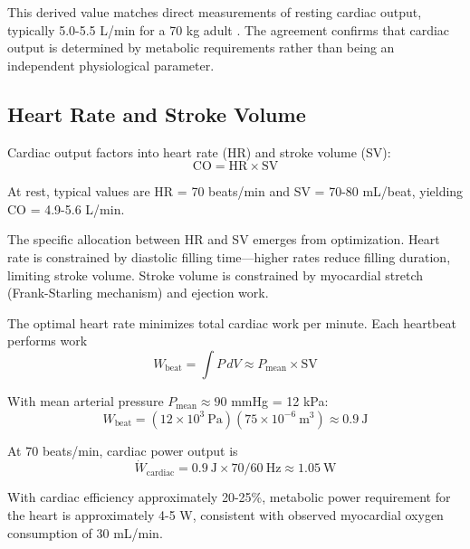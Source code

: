 \documentclass[10pt,twocolumn,a4paper]{article}
\theoremstyle{remark}
\begin{document}
This derived value matches direct measurements of resting cardiac output, typically 5.0-5.5 L/min for a 70 kg adult \cite{holt1968hemodynamic}. The agreement confirms that cardiac output is determined by metabolic requirements rather than being an independent physiological parameter.

\subsection{Heart Rate and Stroke Volume}

Cardiac output factors into heart rate (HR) and stroke volume (SV):
\begin{equation}
\mathrm{CO} = \mathrm{HR} \times \mathrm{SV}
\end{equation}

At rest, typical values are HR = 70 beats/min and SV = 70-80 mL/beat, yielding CO = 4.9-5.6 L/min.

The specific allocation between HR and SV emerges from optimization. Heart rate is constrained by diastolic filling time—higher rates reduce filling duration, limiting stroke volume. Stroke volume is constrained by myocardial stretch (Frank-Starling mechanism) and ejection work.

The optimal heart rate minimizes total cardiac work per minute. Each heartbeat performs work
\begin{equation}
W_{\mathrm{beat}} = \int P \, dV \approx P_{\mathrm{mean}} \times \mathrm{SV}
\end{equation}

With mean arterial pressure $P_{\mathrm{mean}} \approx 90$ mmHg = 12 kPa:
\begin{equation}
W_{\mathrm{beat}} = (12 \times 10^{3}~\mathrm{Pa})(75 \times 10^{-6}~\mathrm{m}^{3}) \approx 0.9~\mathrm{J}
\end{equation}

At 70 beats/min, cardiac power output is
\begin{equation}
\dot{W}_{\mathrm{cardiac}} = 0.9~\mathrm{J} \times 70/60~\mathrm{Hz} \approx 1.05~\mathrm{W}
\end{equation}

With cardiac efficiency approximately 20-25\%, metabolic power requirement for the heart is approximately 4-5 W, consistent with observed myocardial oxygen consumption of 30 mL/min.
\end{document}
